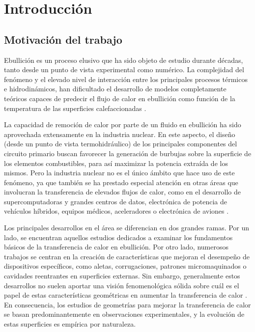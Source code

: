 \chapter{Introducci\'on}

\section{Motivaci\'on del trabajo}

Ebullici\'on es un proceso elusivo que ha sido objeto de estudio durante d\'ecadas, tanto desde un punto de vista experimental como num\'erico. La complejidad del fen\'omeno y el elevado nivel de interacci\'on entre los principales procesos t\'ermicos e hidrodin\'amicos, han dificultado el desarrollo de modelos completamente te\'oricos capaces de predecir el flujo de calor en ebullici\'on como funci\'on de la temperatura de las superficies calefaccionadas \cite{dhir_boiling_1998}.

La capacidad de remoci\'on de calor por parte de un fluido en ebullici\'on ha sido aprovechada extensamente en la industria nuclear. En este aspecto, el dise\~no (desde un punto de vista termohidr\'aulico) de los principales componentes del circuito primario buscan favorecer la generaci\'on de burbujas sobre la superficie de los elementos combustibles, para as\'i maximizar la potencia extra\'ida de los mismos. Pero la industria nuclear no es el \'unico \'ambito que hace uso de este fen\'omeno, ya que tambi\'en se ha prestado especial atenci\'on en otras \'areas que involucran la transferencia de elevados flujos de calor, como en el desarrollo de supercomputadoras y grandes centros de datos, electr\'onica de potencia de veh\'iculos h\'ibridos, equipos m\'edicos, aceleradores o electr\'onica de aviones \cite{mudawar_recent_2013}.

Los principales desarrollos en el \'area se diferencian en dos grandes ramas. Por un lado, se encuentran aquellos estudios dedicados a examinar los fundamentos b\'asicos de la transferencia de calor en ebullici\'on. Por otro lado, numerosos trabajos se centran en la creaci\'on de caracter\'isticas que mejoran el desempe\~no de dispositivos espec\'ificos, como aletas, corrugaciones, patrones micromaquinados o cavidades reentrantes en superficies externas. Sin embargo, generalmente estos desarrollos no suelen aportar una visi\'on fenomenol\'ogica s\'olida sobre cu\'al es el papel de estas caracter\'isticas geom\'etricas en aumentar la transferencia de calor \cite{yazdani_high-fidelity_2016}. En consecuencia, los estudios de geometr\'ias para mejorar la transferencia de calor se basan predominantemente en observaciones experimentales, y la evoluci\'on de estas superficies es emp\'irica por naturaleza.

